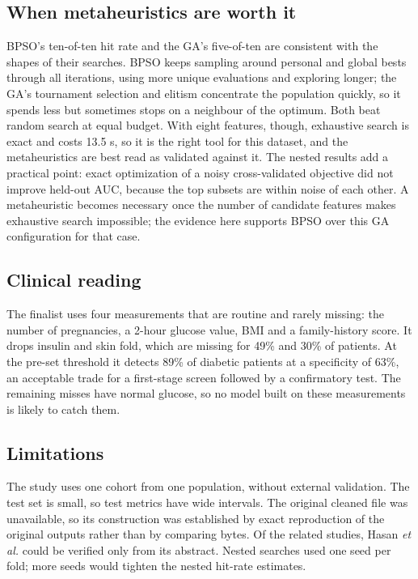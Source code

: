 \documentclass[conference]{IEEEtran}
\begin{document}
\subsection{When metaheuristics are worth it}
BPSO's ten-of-ten hit rate and the GA's five-of-ten are consistent with the shapes of their searches. BPSO keeps sampling around personal and global bests through all iterations, using more unique evaluations and exploring longer; the GA's tournament selection and elitism concentrate the population quickly, so it spends less but sometimes stops on a neighbour of the optimum. Both beat random search at equal budget. With eight features, though, exhaustive search is exact and costs 13.5 s, so it is the right tool for this dataset, and the metaheuristics are best read as validated against it. The nested results add a practical point: exact optimization of a noisy cross-validated objective did not improve held-out AUC, because the top subsets are within noise of each other. A metaheuristic becomes necessary once the number of candidate features makes exhaustive search impossible; the evidence here supports BPSO over this GA configuration for that case.

\subsection{Clinical reading}
The finalist uses four measurements that are routine and rarely missing: the number of pregnancies, a 2-hour glucose value, BMI and a family-history score. It drops insulin and skin fold, which are missing for 49\% and 30\% of patients. At the pre-set threshold it detects 89\% of diabetic patients at a specificity of 63\%, an acceptable trade for a first-stage screen followed by a confirmatory test. The remaining misses have normal glucose, so no model built on these measurements is likely to catch them.

\subsection{Limitations}
The study uses one cohort from one population, without external validation. The test set is small, so test metrics have wide intervals. The original cleaned file was unavailable, so its construction was established by exact reproduction of the original outputs rather than by comparing bytes. Of the related studies, Hasan \textit{et al.} could be verified only from its abstract. Nested searches used one seed per fold; more seeds would tighten the nested hit-rate estimates.
\end{document}
